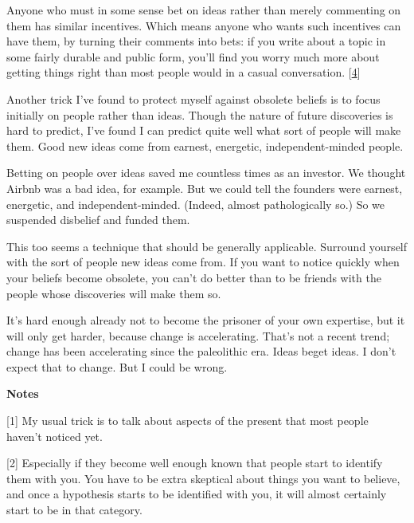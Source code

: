 Anyone who must in
                  some sense bet on ideas rather than merely commenting on them
                  has similar incentives. Which means anyone who wants such
                  incentives can have them, by turning their comments into bets:
                  if you write about a topic in some fairly durable and public
                  form, you'll find you worry much more about getting things
                  right than most people would in a casual conversation.
                  [\href{\#f4n}{4}]

Another trick I've found to protect myself
                  against obsolete beliefs is to focus initially on people
                  rather than ideas. Though the nature of future discoveries is
                  hard to predict, I've found I can predict quite well what sort
                  of people will make them. Good new ideas come from earnest,
                  energetic, independent-minded people.

Betting on
                  people over ideas saved me countless times as an investor. We
                  thought Airbnb was a bad idea, for example. But we could tell
                  the founders were earnest, energetic, and independent-minded.
                  (Indeed, almost pathologically so.) So we suspended disbelief
                  and funded them.

This too seems a technique that
                  should be generally applicable. Surround yourself with the
                  sort of people new ideas come from. If you want to notice
                  quickly when your beliefs become obsolete, you can't do better
                  than to be friends with the people whose discoveries will make
                  them so.

It's hard enough already not to become the
                  prisoner of your own expertise, but it will only get harder,
                  because change is accelerating. That's not a recent trend;
                  change has been accelerating since the paleolithic era. Ideas
                  beget ideas. I don't expect that to change. But I could be
                  wrong.






                  \textbf{Notes}

[1] My usual trick is to talk about aspects of the present that
                  most people haven't noticed yet.

[2] Especially if they become well enough known that people
                  start to identify them with you. You have to be extra
                  skeptical about things you want to believe, and once a
                  hypothesis starts to be identified with you, it will almost
                  certainly start to be in that category.

